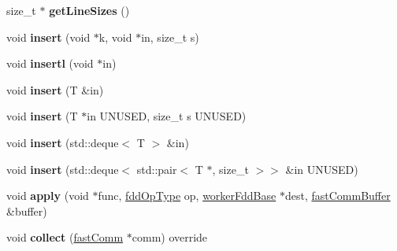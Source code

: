 \begin{DoxyCompactItemize}
\hypertarget{classfaster_1_1__workerFdd_ad8d2388bc738798cb842f05abe3a232f}{}\label{classfaster_1_1__workerFdd_ad8d2388bc738798cb842f05abe3a232f} 
size\+\_\+t $\ast$ {\bfseries get\+Line\+Sizes} ()
\item 
\hypertarget{classfaster_1_1__workerFdd_a34cd7025c01c615d8da5b2994c3cd4fb}{}\label{classfaster_1_1__workerFdd_a34cd7025c01c615d8da5b2994c3cd4fb} 
void {\bfseries insert} (void $\ast$k, void $\ast$in, size\+\_\+t s)
\item 
\hypertarget{classfaster_1_1__workerFdd_a7c870a264f47310d61d4dc388d7fb588}{}\label{classfaster_1_1__workerFdd_a7c870a264f47310d61d4dc388d7fb588} 
void {\bfseries insertl} (void $\ast$in)
\item 
\hypertarget{classfaster_1_1__workerFdd_a16d0b3a72dee9067c78e6de5c00344d5}{}\label{classfaster_1_1__workerFdd_a16d0b3a72dee9067c78e6de5c00344d5} 
void {\bfseries insert} (T \&in)
\item 
\hypertarget{classfaster_1_1__workerFdd_aa4e0cbecfd3b70916364afb85ebbb042}{}\label{classfaster_1_1__workerFdd_aa4e0cbecfd3b70916364afb85ebbb042} 
void {\bfseries insert} (T $\ast$in U\+N\+U\+S\+ED, size\+\_\+t s U\+N\+U\+S\+ED)
\item 
\hypertarget{classfaster_1_1__workerFdd_af8d23cf110e95bd4a57ed8911e462fcd}{}\label{classfaster_1_1__workerFdd_af8d23cf110e95bd4a57ed8911e462fcd} 
void {\bfseries insert} (std\+::deque$<$ T $>$ \&in)
\item 
\hypertarget{classfaster_1_1__workerFdd_a5294bdf9244698046005cd985fc32047}{}\label{classfaster_1_1__workerFdd_a5294bdf9244698046005cd985fc32047} 
void {\bfseries insert} (std\+::deque$<$ std\+::pair$<$ T $\ast$, size\+\_\+t $>$$>$ \&in U\+N\+U\+S\+ED)
\item 
\hypertarget{classfaster_1_1__workerFdd_a77120c8d7ec05e6683acc699dfa86743}{}\label{classfaster_1_1__workerFdd_a77120c8d7ec05e6683acc699dfa86743} 
void {\bfseries apply} (void $\ast$func, \hyperlink{namespacefaster_a64379512d12d41c6e58f176939abfd80}{fdd\+Op\+Type} op, \hyperlink{classfaster_1_1workerFddBase}{worker\+Fdd\+Base} $\ast$dest, \hyperlink{classfaster_1_1fastCommBuffer}{fast\+Comm\+Buffer} \&buffer)
\item 
\hypertarget{classfaster_1_1__workerFdd_a5571e749cf6d7c1ce83e1a2d242d0240}{}\label{classfaster_1_1__workerFdd_a5571e749cf6d7c1ce83e1a2d242d0240} 
void {\bfseries collect} (\hyperlink{classfaster_1_1fastComm}{fast\+Comm} $\ast$comm) override
\item 
\hypertarget{classfaster_1_1__workerFdd_af988c35b5529ae5536e8acdcc9175a4d}{}\label{classfaster_1_1__workerFdd_af988c35b5529ae5536e8acdcc9175a4d} 
$$
\end{DoxyCompactItemize}
